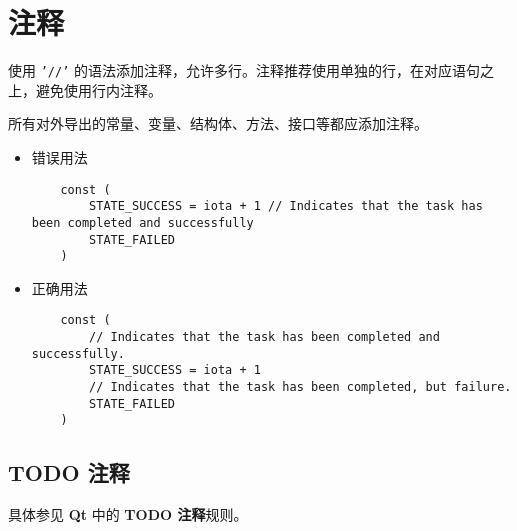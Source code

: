 \chapter{注释}
使用 \texttt{'//'} 的语法添加注释，允许多行。注释推荐使用单独的行，在对应语句之上，避免使用行内注释。

所有对外导出的常量、变量、结构体、方法、接口等都应添加注释。

\begin{itemize}[leftmargin=4em]
\item 错误用法

  \begin{verbatim}
    const (
    	STATE_SUCCESS = iota + 1 // Indicates that the task has been completed and successfully
    	STATE_FAILED
    )
  \end{verbatim}
\item 正确用法

  \begin{verbatim}
    const (
    	// Indicates that the task has been completed and successfully.
    	STATE_SUCCESS = iota + 1
    	// Indicates that the task has been completed, but failure.
    	STATE_FAILED
    )
  \end{verbatim}
\end{itemize}

\section{TODO 注释}
具体参见 \textbf{Qt} 中的 \textbf{TODO 注释}规则。
